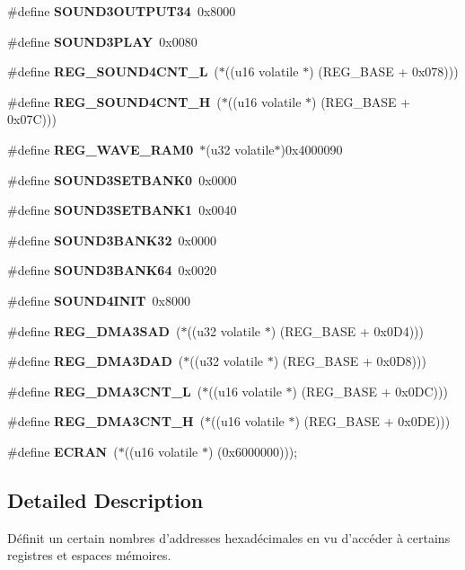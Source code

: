 \begin{DoxyCompactItemize}
\item 
\#define {\bfseries SOUND3OUTPUT34}~0x8000\label{register_8h_a7ed38172b9838e066407557c6b6a1202}

\item 
\#define {\bfseries SOUND3PLAY}~0x0080\label{register_8h_aeab105ee86227e3d0356337c1a9176a8}

\item 
\#define {\bfseries REG\_\-SOUND4CNT\_\-L}~($\ast$((u16 volatile $\ast$) (REG\_\-BASE + 0x078)))\label{register_8h_a8ef6812d9abe31a06771366ff8898f23}

\item 
\#define {\bfseries REG\_\-SOUND4CNT\_\-H}~($\ast$((u16 volatile $\ast$) (REG\_\-BASE + 0x07C)))\label{register_8h_a0acdeb648a552d2991d67a5d9c950954}

\item 
\#define {\bfseries REG\_\-WAVE\_\-RAM0}~$\ast$(u32 volatile$\ast$)0x4000090\label{register_8h_ab3bef5ecb067fe0581ef7414531d0509}

\item 
\#define {\bfseries SOUND3SETBANK0}~0x0000\label{register_8h_a84c0e31a8b6f12ea88929e7f040d7139}

\item 
\#define {\bfseries SOUND3SETBANK1}~0x0040\label{register_8h_a19a7d51117d41dba7de27a41416e8e1a}

\item 
\#define {\bfseries SOUND3BANK32}~0x0000\label{register_8h_aed8f1ceb0592ba93c1fd36160ea48ee6}

\item 
\#define {\bfseries SOUND3BANK64}~0x0020\label{register_8h_a6a07d063a0b39bf333e1c12c2fa880cc}

\item 
\#define {\bfseries SOUND4INIT}~0x8000\label{register_8h_ae6b4fe25b8a1bb6c11fc8d54a66c1ca6}

\item 
\#define {\bfseries REG\_\-DMA3SAD}~($\ast$((u32 volatile $\ast$) (REG\_\-BASE + 0x0D4)))\label{register_8h_ab9bed89d09e421b4f9593068056b376f}

\item 
\#define {\bfseries REG\_\-DMA3DAD}~($\ast$((u32 volatile $\ast$) (REG\_\-BASE + 0x0D8)))\label{register_8h_a69252e92caed680b03828e17343c5dda}

\item 
\#define {\bfseries REG\_\-DMA3CNT\_\-L}~($\ast$((u16 volatile $\ast$) (REG\_\-BASE + 0x0DC)))\label{register_8h_a32f8cd34ca2b26a8a05dfc991652de41}

\item 
\#define {\bfseries REG\_\-DMA3CNT\_\-H}~($\ast$((u16 volatile $\ast$) (REG\_\-BASE + 0x0DE)))\label{register_8h_a5d2cdf7831dd87671c4d94aedbaf756a}

\item 
\#define {\bfseries ECRAN}~($\ast$((u16 volatile $\ast$) (0x6000000)));\label{register_8h_afb951c0ce104ce7b2ee159085f7e865f}

\end{DoxyCompactItemize}


\subsection{Detailed Description}
Définit un certain nombres d'addresses hexadécimales en vu d'accéder à certains registres et espaces mémoires. 